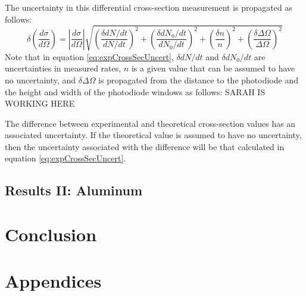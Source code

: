 \documentclass[a4paper]{article}
\begin{document}
The uncertainty in this differential cross-section measurement is propagated as follows:
\begin{equation} \label{eq:expCrossSecUncert}
 \delta \left( \frac{d \sigma}{d \Omega} \right) 
   = \left\lvert \frac{d \sigma}{d \Omega} \right\rvert
   \sqrt
   {
        \left( \frac{\delta dN/dt}{dN/dt} \right) ^2
        +
        \left( \frac{\delta dN_0/dt}{dN_0/dt} \right) ^2
        +
        \left( \frac{\delta n}{n} \right) ^2
        +
        \left( \frac{\delta \Delta \Omega}{\Delta \Omega} \right) ^2
   }
\end{equation}
Note that in equation \ref{eq:expCrossSecUncert}, $\delta dN/dt$ and $\delta dN_0/dt$ are uncertainties in measured rates, $n$ is a given value that can be assumed to have no uncertainty, and $\delta \Delta \Omega$ is propagated from the distance to the photodiode and the height and width of the photodiode windows as follows:
SARAH IS WORKING HERE

The difference between experimental and theoretical cross-section values has an associated uncertainty. If the theoretical value is assumed to have no uncertainty, then the uncertainty associated with the difference will be that calculated in equation \ref{eq:expCrossSecUncert}.

\subsection{Results II: Aluminum}

\qq 

\qq 

\qq

\section{Conclusion}

\qq 

\qq 

\section{Appendices}
\end{document}
